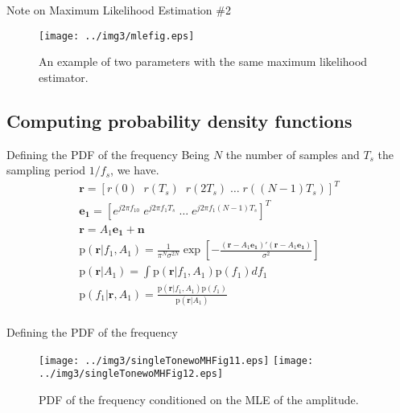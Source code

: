 ﻿\documentclass[mathserif]{beamer}
\begin{document}
	\begin{frame}{Note on Maximum Likelihood Estimation \#2}
		\begin{figure}
			\texttt{[image: ../img3/mlefig.eps]}
			\caption{An example of two parameters with the same maximum likelihood estimator.}
		\end{figure}
	\end{frame}
	
	
	\subsection{Computing probability density functions}
	\begin{frame}{Defining the PDF of the frequency}
		Being $N$ the number of samples and $T_s$ the sampling period $1/f_s$, we have.
		\begin{gather*}
			\mathbf{r} =  [r(0) \; \; r(T_s) \; \; r(2T_s) \; \dots \; r((N-1)T_s)]^T \\
			\mathbf{e_1} =  [e^{j2\pi f_10} \; e^{j2\pi f_1T_s} \; \dots \; e^{j2\pi f_1(N-1)T_s}]^T \\		
			\mathbf{r} = A_1\mathbf{e_1} + \mathbf{n} \\
			\mathrm{p}(\mathbf{r}|f_1,A_1) = \frac{1}{\pi^N\sigma^{2N}}\exp\left[-\frac{(\mathbf{r}-A_1\mathbf{e_1})'
				(\mathbf{r}-A_1\mathbf{e_1})}{\sigma^2}\right] \\
			\mathrm{p}(\mathbf{r}|A_1) = \int \mathrm{p}(\mathbf{r}|f_1,A_1)\mathrm{p}(f_1)df_1\\
			\mathrm{p}(f_1|\mathbf{r},A_1) = \frac{\mathrm{p}(\mathbf{r}|f_1,A_1)\mathrm{p}(f_1)}{\mathrm{p}(\mathbf{r}|A_1)} \\
		\end{gather*}
	\end{frame}
	
	\begin{frame}{Defining the PDF of the frequency}
		\begin{figure}
			\centering
			\texttt{[image: ../img3/singleTonewoMHFig11.eps]}
			\texttt{[image: ../img3/singleTonewoMHFig12.eps]}
			\caption{PDF of the frequency conditioned on the MLE of the amplitude.}
		\end{figure}
	\end{frame}	
	
\end{document}
